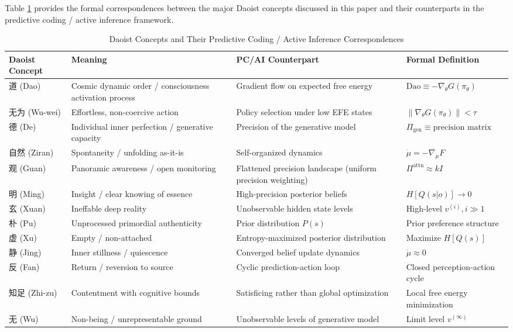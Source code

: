 \documentclass[11pt,a4paper]{article}
\begin{document}
Table \ref{tab:mapping} provides the formal correspondences between the major Daoist concepts discussed in this paper and their counterparts in the predictive coding / active inference framework.

\begin{table}[htbp]
\centering
\caption{Daoist Concepts and Their Predictive Coding / Active Inference Correspondences}
\label{tab:mapping}
\begin{tabular}{@{}p{2.2cm}p{2.8cm}p{4.5cm}p{4.5cm}@{}}
\toprule
\textbf{Daoist Concept} & \textbf{Meaning} & \textbf{PC/AI Counterpart} & \textbf{Formal Definition} \\
\midrule
道 (Dao) & Cosmic dynamic order / consciousness activation process & Gradient flow on expected free energy & $\text{Dao} \equiv -\nabla_\theta G(\pi_\theta)$ \\
\addlinespace
无为 (Wu-wei) & Effortless, non-coercive action & Policy selection under low EFE states & $\|\nabla_\theta G(\pi_\theta)\| < \tau$ \\
\addlinespace
德 (De) & Individual inner perfection / generative capacity & Precision of the generative model & $\Pi_{\text{gen}} \equiv \text{precision matrix}$ \\
\addlinespace
自然 (Ziran) & Spontaneity / unfolding as-it-is & Self-organized dynamics & $\dot{\mu} = -\nabla_\mu F$ \\
\addlinespace
观 (Guan) & Panoramic awareness / open monitoring & Flattened precision landscape (uniform precision weighting) & $\Pi^{\text{attn}} \approx kI$ \\
\addlinespace
明 (Ming) & Insight / clear knowing of essence & High-precision posterior beliefs & $H[Q(s|o)] \to 0$ \\
\addlinespace
玄 (Xuan) & Ineffable deep reality & Unobservable hidden state levels & High-level $v^{(i)}, i \gg 1$ \\
\addlinespace
朴 (Pu) & Unprocessed primordial authenticity & Prior distribution $P(s)$ & Prior preference structure \\
\addlinespace
虚 (Xu) & Empty / non-attached & Entropy-maximized posterior distribution & Maximize $H[Q(s)]$ \\
\addlinespace
静 (Jing) & Inner stillness / quiescence & Converged belief update dynamics & $\dot{\mu} \approx 0$ \\
\addlinespace
反 (Fan) & Return / reversion to source & Cyclic prediction-action loop & Closed perception-action cycle \\
\addlinespace
知足 (Zhi-zu) & Contentment with cognitive bounds & Satisficing rather than global optimization & Local free energy minimization \\
\addlinespace
无 (Wu) & Non-being / unrepresentable ground & Unobservable levels of generative model & Limit level $v^{(\infty)}$ \\
\bottomrule
\end{tabular}
\end{table}
\end{document}
